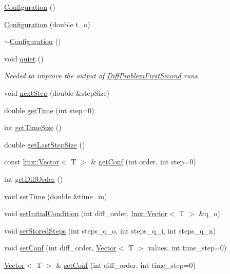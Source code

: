 \begin{DoxyCompactItemize}
\item 
\hyperlink{classlmx_1_1Configuration_a7554019ac3c088cf4043e28a2e69a9b8}{Configuration} ()
\item 
\hyperlink{classlmx_1_1Configuration_a840f3a27367514da1e9735550cebe7f5}{Configuration} (double t\-\_\-o)
\item 
\hyperlink{classlmx_1_1Configuration_a9537a1dbac192b364e35edb4d14114ba}{$\sim$\-Configuration} ()
\item 
void \hyperlink{classlmx_1_1Configuration_a2820c2dd1a2c0879391a9fc4184e8d33}{quiet} ()
\begin{DoxyCompactList}\small\item\em Needed to improve the output of \hyperlink{classlmx_1_1DiffProblemFirstSecond}{Diff\-Problem\-First\-Second} runs. \end{DoxyCompactList}\item 
void \hyperlink{classlmx_1_1Configuration_a78a886ffbf9c2f3614066667374effd7}{next\-Step} (double \&step\-Size)
\item 
double \hyperlink{classlmx_1_1Configuration_ab4b84750deaab4d7041e9e6b7de5e71f}{get\-Time} (int step=0)
\item 
int \hyperlink{classlmx_1_1Configuration_a8e703f449981bc50ec13c14b4fc03382}{get\-Time\-Size} ()
\item 
double \hyperlink{classlmx_1_1Configuration_af40c6ec05472dbca4a4a80ffd6db6e51}{get\-Last\-Step\-Size} ()
\item 
const \hyperlink{classlmx_1_1Vector}{lmx\-::\-Vector}$<$ T $>$ \& \hyperlink{classlmx_1_1Configuration_a06ae75f9c8c797bd3801f60e8861ac97}{get\-Conf} (int order, int step=0)
\item 
int \hyperlink{classlmx_1_1Configuration_a2bfdf6ac49d60696c0d2924210af6f0c}{get\-Diff\-Order} ()
\item 
void \hyperlink{classlmx_1_1Configuration_af910b7f153fc73967221cbf95b2f02e6}{set\-Time} (double \&time\-\_\-in)
\item 
void \hyperlink{classlmx_1_1Configuration_af437ee887381048646611a1b7c79c80e}{set\-Initial\-Condition} (int diff\-\_\-order, \hyperlink{classlmx_1_1Vector}{lmx\-::\-Vector}$<$ T $>$ \&q\-\_\-o)
\item 
void \hyperlink{classlmx_1_1Configuration_a9a253bca9639d1c4f8500fd76e694862}{set\-Stored\-Steps} (int steps\-\_\-q\-\_\-o, int steps\-\_\-q\-\_\-i, int steps\-\_\-q\-\_\-n)
\item 
void \hyperlink{classlmx_1_1Configuration_a3bd19b906326293cb5cecbd000121c3a}{set\-Conf} (int diff\-\_\-order, \hyperlink{classlmx_1_1Vector}{Vector}$<$ T $>$ values, int time\-\_\-step=0)
\item 
\hyperlink{classlmx_1_1Vector}{Vector}$<$ T $>$ \& \hyperlink{classlmx_1_1Configuration_ac9a6b4a9ec19c4af12a4181b8feeb3bf}{set\-Conf} (int diff\-\_\-order, int time\-\_\-step=0)
\end{DoxyCompactItemize}


